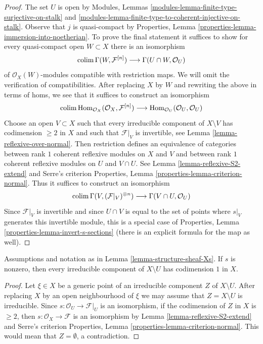 \begin{proof}
The set $U$ is open by Modules, Lemmas
\ref{modules-lemma-finite-type-surjective-on-stalk} and
\ref{modules-lemma-finite-type-to-coherent-injective-on-stalk}.
Observe that $j$ is quasi-compact by
Properties, Lemma \ref{properties-lemma-immersion-into-noetherian}.
To prove the final statement it suffices to show for every
quasi-compact open $W \subset X$ there is an isomorphism
$$
\mathop{\mathrm{colim}}\nolimits \Gamma(W, \mathcal{F}^{[n]})
\longrightarrow
\Gamma(U \cap W, \mathcal{O}_U)
$$
of $\mathcal{O}_X(W)$-modules compatible with restriction maps.
We will omit the verification of compatibilities.
After replacing $X$ by $W$ and rewriting the above in
terms of homs, we see that it suffices to construct an isomorphism
$$
\mathop{\mathrm{colim}}\nolimits \mathop{\mathrm{Hom}}\nolimits_{\mathcal{O}_X}(\mathcal{O}_X, \mathcal{F}^{[n]})
\longrightarrow
\mathop{\mathrm{Hom}}\nolimits_{\mathcal{O}_U}(\mathcal{O}_U, \mathcal{O}_U)
$$
Choose an open $V \subset X$ such that every irreducible component of
$X \setminus V$ has codimension $\geq 2$ in $X$ and such that
$\mathcal{F}|_V$ is invertible, see Lemma \ref{lemma-reflexive-over-normal}.
Then restriction defines an equivalence of categories
between rank $1$ coherent reflexive modules on $X$ and $V$
and between rank $1$ coherent reflexive modules on $U$ and $V \cap U$.
See Lemma \ref{lemma-reflexive-S2-extend} and Serre's criterion
Properties, Lemma \ref{properties-lemma-criterion-normal}.
Thus it suffices to construct an isomorphism
$$
\mathop{\mathrm{colim}}\nolimits \Gamma(V, (\mathcal{F}|_V)^{\otimes n}) \longrightarrow
\Gamma(V \cap U, \mathcal{O}_U)
$$
Since $\mathcal{F}|_V$ is invertible and since $U \cap V$ is
equal to the set of points where $s|_V$ generates this invertible module,
this is a special case of
Properties, Lemma \ref{properties-lemma-invert-s-sections}
(there is an explicit formula for the map as well).
\end{proof}

\begin{lemma}
\label{lemma-Xs-codim-complement}
Assumptions and notation as in Lemma \ref{lemma-structure-sheaf-Xs}.
If $s$ is nonzero, then every irreducible component of $X \setminus U$
has codimension $1$ in $X$.
\end{lemma}

\begin{proof}
Let $\xi \in X$ be a generic point of an irreducible component $Z$ of
$X \setminus U$. After replacing $X$ by an open neighbourhood of
$\xi$ we may assume that $Z = X \setminus U$ is irreducible. Since
$s : \mathcal{O}_U \to \mathcal{F}|_U$ is an isomorphism, if
the codimension of $Z$ in $X$ is $\geq 2$, then
$s : \mathcal{O}_X \to \mathcal{F}$ is an isomorphism by
Lemma \ref{lemma-reflexive-S2-extend} and Serre's criterion
Properties, Lemma \ref{properties-lemma-criterion-normal}.
This would mean that $Z = \emptyset$, a contradiction.
\end{proof}

